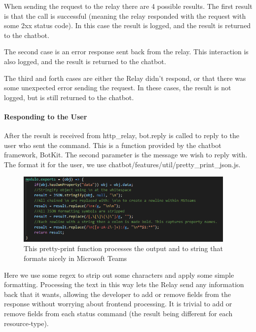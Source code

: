 \documentclass[onecolumn, draftclsnofoot,10pt, compsoc]{IEEEtran}
\begin{document}
    When sending the request to the relay there are 4 possible results.
    The first result is that the call is successful (meaning the relay responded with the request with some 2xx status code).
    In this case the result is logged, and the result is returned to the chatbot.
    
    The second case is an error response sent back from the relay.
    This interaction is also logged, and the result is returned to the chatbot.
    
    The third and forth cases are either the Relay didn't respond, or that there was some unexpected error sending the request.
    In these cases, the result is not logged, but is still returned to the chatbot.
    
    \paragraph{Responding to the User}
    After the result is received from http\_relay,  bot.reply is called to reply to the user who sent the command.
    This is a function provided by the chatbot framework, BotKit.
    The second parameter is the message we wish to reply with.
    The format it for the user, we use chatbot/features/util/pretty\_print\_json.js.
    
    \begin{figure}[ht]
        \centering
        \includegraphics[height=3.5cm]{code6.png}
        \caption[Processing the Relay's Response]{This pretty-print function processes the output and to string that formats nicely in Microsoft Teams}
        \label{fig:Processing the Relay's Response}
    \end{figure}
    
    Here we use some regex to strip out some characters and apply some simple formatting.
    Processing the text in this way lets the Relay send any information back that it wants, allowing the developer to add or remove fields from the response without worrying about frontend processing.
    It is trivial to add or remove fields from each status command (the result being different for each resource-type).
\end{document}
